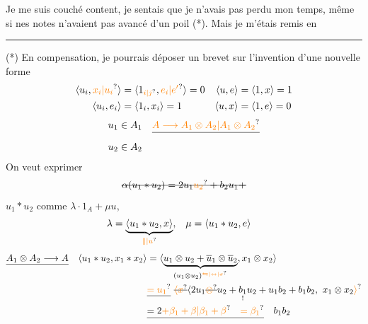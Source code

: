 Je me suis couché content, je sentais que je n'avais pas perdu mon temps, même si nes notes n'avaient pas avancé d'un poil (*). Mais je m'étais remis en

\noindent\rule{3cm}{.35pt}

{\small (*) En compensation, je pourrais déposer un brevet sur l'invention d'une nouvelle forme }
\[
\begin{aligned}
\langle u_i,\unsure{x_i|u_i}\rangle&=\langle1_{\unsure{i|j}},\unsure{e_i|e'}\rangle=0&
 \langle u,e\rangle&=\langle1,x\rangle=1\\
\langle u_i,e_i\rangle&=\langle1_i,x_i\rangle=1&
 \langle u,x\rangle&=\langle1,e\rangle=0
\end{aligned}
\]
\[
\begin{aligned}
u_1&\in A_1&\deleted{\unsure{A\longrightarrow A_1\otimes A_2|A_1\otimes A_2}}\\
u_2&\in A_2&
\end{aligned}
\]
On veut exprimer
\[
\deleted{\alpha(u_1\ast u_2)=2u_1\unsure{u_2}+b_2u_1+}
\]
$u_1\ast u_2$ comme $\lambda\cdot1_A+\mu u$,  
\[
\begin{aligned}
\lambda&=\underbrace{\langle u_1\ast u_2,x\rangle}_{\unsure{\Vert|u}} ,
 &\mu&=\langle u_1\ast u_2,e\rangle
\end{aligned}
\]
\[
\begin{aligned}
\deleted{A_1\otimes A_2\longrightarrow A}\quad
\langle u_1\ast u_2,x_1\ast x_2\rangle
 &=\langle\underbrace{u_1\otimes u_2+\overline u_1\otimes\overline u_2}_{(u_1\otimes u_2)^{\unsure{\leftrightarrows|\leftrightarrow|\sigma}}},x_1\otimes x_2\rangle\\
 &\deleted{\unsure{=u_1}}\ \deleted{\unsure{\langle x}}\langle 2u_1\deleted{\unsure{\otimes}}u_2+
 \underset{!}{b_1}u_2+u_1b_2+b_1b_2,\ x_1\otimes x_2\unsure{\rangle}\\
 &\deleted{=2\unsure{+\beta_1+\beta|\beta_1+\beta}\quad\unsure{=\beta_1}}\quad b_1b_2
\end{aligned}
\]
